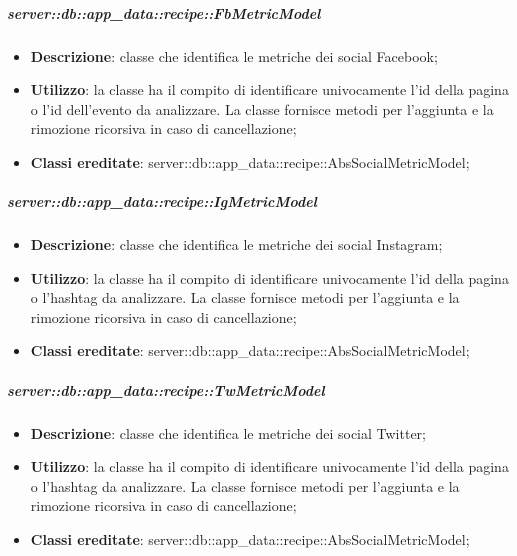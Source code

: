 		\subparagraph{server::db::app\_data::recipe::FbMetricModel} %
		\label{subp:server_db_app_data_recipe_fbmetricmodel}
			\begin{itemize}
				\item \textbf{Descrizione}: classe che identifica le metriche dei social Facebook;
				\item \textbf{Utilizzo}: la classe ha il compito di identificare univocamente l'id della pagina o l'id dell'evento da analizzare. La classe fornisce metodi per l'aggiunta e la rimozione ricorsiva in caso di cancellazione;
				\item \textbf{Classi ereditate}: server::db::app\_data::recipe::AbsSocialMetricModel;
			\end{itemize}


		\subparagraph{server::db::app\_data::recipe::IgMetricModel} %
		\label{subp:server_db_app_data_recipe_igmetricmodel}
			\begin{itemize}
				\item \textbf{Descrizione}: classe che identifica le metriche dei social Instagram;
				\item \textbf{Utilizzo}: la classe ha il compito di identificare univocamente l'id della pagina o l'hashtag da analizzare. La classe fornisce metodi per l'aggiunta e la rimozione ricorsiva in caso di cancellazione;
				\item \textbf{Classi ereditate}: server::db::app\_data::recipe::AbsSocialMetricModel;
			\end{itemize}


		\subparagraph{server::db::app\_data::recipe::TwMetricModel} %
		\label{subp:server_db_app_data_recipe_twmetricmodel}
			\begin{itemize}
				\item \textbf{Descrizione}: classe che identifica le metriche dei social Twitter;
				\item \textbf{Utilizzo}: la classe ha il compito di identificare univocamente l'id della pagina o l'hashtag da analizzare. La classe fornisce metodi per l'aggiunta e la rimozione ricorsiva in caso di cancellazione;
				\item \textbf{Classi ereditate}: server::db::app\_data::recipe::AbsSocialMetricModel;
			\end{itemize}
